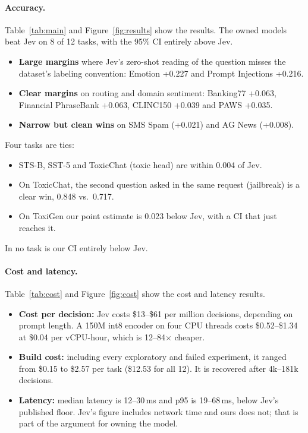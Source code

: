 \documentclass[11pt]{article}
\begin{document}
\paragraph{Accuracy.}
Table~\ref{tab:main} and Figure~\ref{fig:results} show the results.
The owned models beat Jev on 8 of 12 tasks, with the 95\% CI entirely above Jev.
\begin{itemize}
  \item \textbf{Large margins} where Jev's zero-shot reading of the question misses the dataset's labeling convention: Emotion +0.227 and Prompt Injections +0.216.
  \item \textbf{Clear margins} on routing and domain sentiment: Banking77 +0.063, Financial PhraseBank +0.063, CLINC150 +0.039 and PAWS +0.035.
  \item \textbf{Narrow but clean wins} on SMS Spam (+0.021) and AG News (+0.008).
\end{itemize}
Four tasks are ties:
\begin{itemize}
  \item STS-B, SST-5 and ToxicChat (toxic head) are within 0.004 of Jev.
  \item On ToxicChat, the second question asked in the same request (jailbreak) is a clear win, 0.848 vs.\ 0.717.
  \item On ToxiGen our point estimate is 0.023 below Jev, with a CI that just reaches it.
\end{itemize}
In no task is our CI entirely below Jev.

\paragraph{Cost and latency.}
Table~\ref{tab:cost} and Figure~\ref{fig:cost} show the cost and latency results.
\begin{itemize}
  \item \textbf{Cost per decision:} Jev costs \$13--\$61 per million decisions, depending on prompt length. A 150M int8 encoder on four CPU threads costs \$0.52--\$1.34 at \$0.04 per vCPU-hour, which is 12--84$\times$ cheaper.
  \item \textbf{Build cost:} including every exploratory and failed experiment, it ranged from \$0.15 to \$2.57 per task (\$12.53 for all 12). It is recovered after 4k--181k decisions.
  \item \textbf{Latency:} median latency is 12--30\,ms and p95 is 19--68\,ms, below Jev's published floor. Jev's figure includes network time and ours does not; that is part of the argument for owning the model.
\end{itemize}
\end{document}
